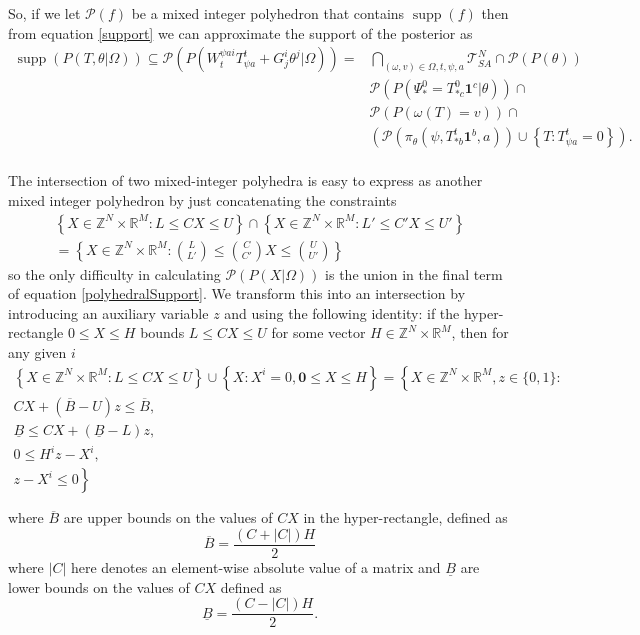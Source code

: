 \documentclass{article}
\DeclareMathOperator\supp{supp}
\begin{document}
So, if we let $\mathcal{P}(f)$ be a mixed integer polyhedron that contains $\supp(f)$ then from equation \eqref{support} we can approximate the support of the posterior as
\begin{equation}
\begin{aligned}
\supp(P( T, \theta |\Omega)) \subseteq \mathcal{P}(P(W^{\psi a i}_{t}T^t_{\psi a} + G^i_j\theta^j|\Omega)) =
& \bigcap_{(\omega,v) \in \Omega,t,\psi, a} \mathcal{T}^N_{SA} \cap \mathcal{P}(P(\theta)) \\
& \mathcal{P}(P(\Psi^0_* = T^0_{* c}\mathbf{1}^c|\theta)) \cap\\
&    \mathcal{P}\left(P\left(\omega(T)=v\right)\right) \cap \\
& 
\left(\mathcal{P}\left(\pi_\theta(\psi,T^t_{* b}\mathbf{1}^b,a)\right)
\cup
\left\{T: T^t_{\psi a} = 0\right\}\right).
\\
\end{aligned}
\label{polyhedralSupport}
\end{equation}

The intersection of two mixed-integer polyhedra is easy to express as another mixed integer polyhedron by just concatenating the constraints
\begin{multline}
\left\{ X\in\mathbb{Z}^N \times \mathbb{R}^M : L \le  CX \le U \right\}
\cap
\left\{ X\in\mathbb{Z}^{N} \times \mathbb{R}^{M} : L' \le  C'X \le U' \right\}\\
= \left\{ X\in\mathbb{Z}^{N} \times \mathbb{R}^{M} : {L \choose L'}  \le   {C \choose C'}X \le {U \choose U'} \right\}
\label{intersection}
\end{multline}
so the only difficulty in calculating $\mathcal{P}(P(X|\Omega))$ is the union in the final term of equation \eqref{polyhedralSupport}. We transform this into an intersection by introducing an auxiliary variable $z$ and using the following identity: if the hyper-rectangle $0 \le X \le H$ bounds $L \le C X \le U$ for some vector $H \in \mathbb{Z}^N \times \mathbb{R}^M$, then for any given $i$ 
\begin{multline}
\left\{ X\in\mathbb{Z}^N \times \mathbb{R}^M : L \le C X \le U \right\}
\cup
\left\{X: X^i = 0, \mathbf{0} \le X \le H\right\}
= \left\{ \right.X\in\mathbb{Z}^N \times \mathbb{R}^M, z\in\{0,1\}:\\
CX + (\overline{B}-U)z \le \overline{B},\\
\underline{B} \le CX + (\underline{B}-L)z,\\
0 \le H^iz - X^i,\\
 z - X^i \le 0 \left. \right\}\\
\\
\label{implication}
\end{multline}
where $\overline{B}$ are upper bounds on the values of $CX$ in the hyper-rectangle, defined as
\[
\overline{B} = \frac{\left(C+\left|C\right|\right)H}{2}
\]
where $|C|$ here denotes an element-wise absolute value of a matrix and $\underline{B}$ are lower bounds on the values of $CX$ defined as
\[
\underline{B} = \frac{\left(C - \left|C\right|\right)H}{2}.
\]
\end{document}
